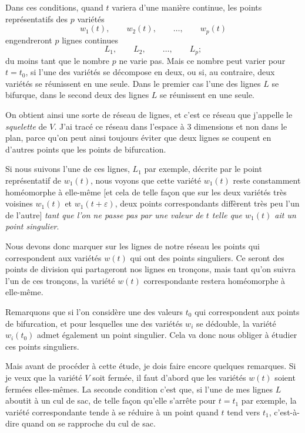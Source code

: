 \documentclass{article}
\begin{document}
Dans ces conditions, quand $t$ variera d'une manière continue, les points représentatifs des $p$ variétés
\[ w_{1}(t), \qquad w_{2}(t), \qquad \ldots, \qquad w_{p}(t) \]
engendreront $p$ lignes continues
\[ L_{1}, \qquad L_{2}, \qquad \ldots, \qquad L_{p}; \]
du moins tant que le nombre $p$ ne varie pas. Mais ce nombre peut varier pour $t = t_{0}$, si l'une des variétés se décompose en deux, ou si, au contraire, deux variétés se réunissent en une seule. Dans le premier cas l'une des lignes $L$ se bifurque, dans le second deux des lignes $L$ se réunissent en une seule.

On obtient ainsi une sorte de réseau de lignes, et c'est ce réseau que j'appelle le \emph{squelette} de $V$. J'ai tracé ce réseau dans l'espace à 3 dimensions et non dans le plan, parce qu'on peut ainsi toujours éviter que deux lignes se coupent en d'autres points que les points de bifurcation.

Si nous suivons l'une de ces lignes, $L_{1}$ par exemple, décrite par le point représentatif de $w_{1}(t)$, nous voyons que cette variété $w_{1}(t)$ reste constamment homéomorphe à elle-même [et cela de telle façon que sur les deux variétés très voisines $w_{1}(t)$ et $w_{1}(t + \varepsilon)$, deux points correspondants diffèrent très peu l'un de l'autre] \emph{tant que l'on ne passe pas par une valeur de $t$ telle que $w_{1}(t)$ ait un point singulier}.

Nous devons donc marquer sur les lignes de notre réseau les points qui correspondent aux variétés $w(t)$ qui ont des points singuliers. Ce seront des points de division qui partageront nos lignes en tronçons, mais tant qu'on suivra l'un de ces tronçons, la variété $w(t)$ correspondante restera homéomorphe à elle-même.


Remarquons que si l'on considère une des valeurs $t_{0}$ qui correspondent aux points de bifurcation, et pour lesquelles une des variétés $w_{i}$ se dédouble, la variété $w_{i}(t_{0})$ admet également un point singulier. Cela va donc nous obliger à étudier ces points singuliers.

Mais avant de procéder à cette étude, je dois faire encore quelques remarques. Si je veux que la variété $V$ soit fermée, il faut d'abord que les variétés $w(t)$ soient fermées elles-mêmes. La seconde condition c'est que, si l'une de mes lignes $L$ aboutit à un cul de sac, de telle façon qu'elle s'arrête pour $t = t_{1}$ par exemple, la variété correspondante tende à se réduire à un point quand $t$ tend vers $t_{1}$, c'est-à-dire quand on se rapproche du cul de sac.
\end{document}
